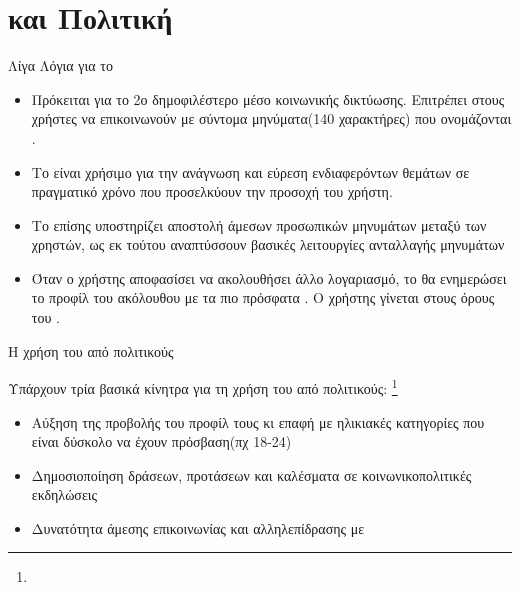 \documentclass{beamer}
\begin{document}
\section{{} και Πολιτική}

\begin{frame}
\begin{flushleft}
{\color{blue}Λίγα Λόγια για το {}}
\end{flushleft}
\vfill
\begin{itemize}
\item Πρόκειται για το 2ο δημοφιλέστερο μέσο κοινωνικής δικτύωσης. Επιτρέπει στους χρήστες να επικοινωνούν με σύντομα μηνύματα(140 χαρακτήρες) που ονομάζονται {}.
\item Το {} είναι χρήσιμο για την ανάγνωση και εύρεση ενδιαφερόντων θεμάτων σε πραγματικό χρόνο που προσελκύουν την προσοχή του χρήστη.
\item Το {} επίσης υποστηρίζει αποστολή άμεσων προσωπικών μηνυμάτων μεταξύ των χρηστών, ως εκ τούτου αναπτύσσουν βασικές λειτουργίες ανταλλαγής μηνυμάτων
\item Όταν ο χρήστης αποφασίσει να ακολουθήσει άλλο λογαριασμό, το {} θα ενημερώσει το προφίλ του ακόλουθου με τα πιο πρόσφατα {}. Ο χρήστης γίνεται στους όρους του {} {}.
\vfill
\end{itemize}
\end{frame}

\begin{frame}
\begin{flushleft}
{\color{blue}Η χρήση του {} από πολιτικούς} 
\end{flushleft}
\vfill
\item Υπάρχουν τρία βασικά κίνητρα για τη χρήση του {} από πολιτικούς: \footnote{{}}
\begin{itemize}
\item Αύξηση της προβολής του προφίλ τους κι επαφή με ηλικιακές κατηγορίες που είναι δύσκολο να έχουν πρόσβαση(πχ 18-24)
\item Δημοσιοποίηση δράσεων, προτάσεων και καλέσματα σε κοινωνικοπολιτικές εκδηλώσεις
\item Δυνατότητα άμεσης επικοινωνίας και αλληλεπίδρασης με {}
\end{itemize}
\end{frame}
\end{document}

